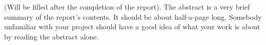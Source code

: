 (Will be filled after the completion of the report). The abstract is a very brief summary of the report's contents. It should be about half-a-page long. Somebody unfamiliar with your project should have a good idea of what your work is about by reading the abstract alone.